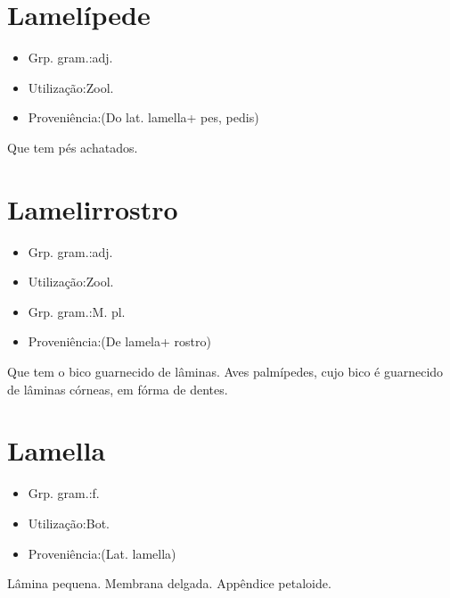 \section{Lamelípede}
\begin{itemize}
\item {Grp. gram.:adj.}
\end{itemize}
\begin{itemize}
\item {Utilização:Zool.}
\end{itemize}
\begin{itemize}
\item {Proveniência:(Do lat. \textunderscore lamella\textunderscore  + \textunderscore pes\textunderscore , \textunderscore pedis\textunderscore )}
\end{itemize}
Que tem pés achatados.
\section{Lamelirrostro}
\begin{itemize}
\item {Grp. gram.:adj.}
\end{itemize}
\begin{itemize}
\item {Utilização:Zool.}
\end{itemize}
\begin{itemize}
\item {Grp. gram.:M. pl.}
\end{itemize}
\begin{itemize}
\item {Proveniência:(De \textunderscore lamela\textunderscore  + \textunderscore rostro\textunderscore )}
\end{itemize}
Que tem o bico guarnecido de lâminas.
Aves palmípedes, cujo bico é guarnecido de lâminas córneas, em fórma de dentes.
\section{Lamella}
\begin{itemize}
\item {Grp. gram.:f.}
\end{itemize}
\begin{itemize}
\item {Utilização:Bot.}
\end{itemize}
\begin{itemize}
\item {Proveniência:(Lat. \textunderscore lamella\textunderscore )}
\end{itemize}
Lâmina pequena.
Membrana delgada.
Appêndice petaloide.
